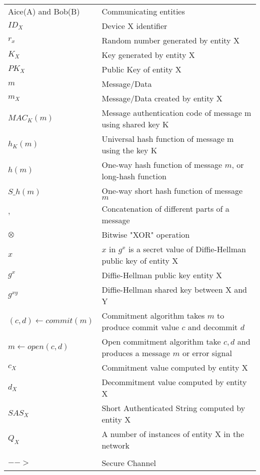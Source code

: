  \begin{longtable}[l]{p{100pt} p{200pt}} 
Aice(A) and Bob(B) & Communicating entities \\ 
$ID_X$ & Device X identifier \\ 
$r_x$ & Random number generated by entity X \\
$K_X$ & Key generated by entity X \\
$PK_X$ & Public Key of entity X \\ 
$m$ & Message/Data \\ 
$m_X$ & Message/Data created by entity X \\ 
$MAC_K(m)$ & Message authentication code of message m using shared key K \\ 
$h_K(m)$ & Universal hash function of message m using the key K \\ 
$h(m)$ & One-way hash function of message $m$, or long-hash function \\ 
$S\_h(m)$ & One-way short hash function of message $m$ \\
$,$ & Concatenation of different parts of a message\\ 
$\otimes$ & Bitwise "XOR" operation \\ 
$x$ & $x$ in $g^x$ is a secret value of Diffie-Hellman public key of entity X \\ 
$g^x$ & Diffie-Hellman public key entity X \\ 
$g^{xy}$ & Diffie-Hellman shared key between X and Y \\ 
$(c,d) \leftarrow commit(m)$ & Commitment algorithm takes $m$ to produce commit value $c$ and decommit $d$ \\ 
$m \leftarrow open(c,d)$ & Open commitment algorithm take $c,d$ and produces a message $m$ or error signal \\ 
$c_X$ & Commitment value computed by entity X \\
$d_X$ & Decommitment value computed by entity X \\
$SAS_X$ & Short Authenticated String computed by entity X \\ 
 $Q_X$ & A number of instances of entity X in the network \\ 
\hline \\
$-->$ & Secure Channel \\

\end{longtable} 